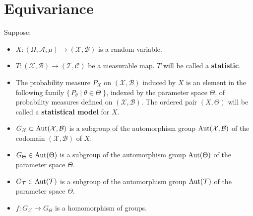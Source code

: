 
\newcommand{\Aut}{\textnormal{Aut}}

\section{Equivariance}
\setcounter{theorem}{0}

\begin{definition}\quad
Suppose:
\begin{itemize}
	\item $X : (\Omega,\mathcal{A},\mu) \longrightarrow (\mathcal{X},\mathcal{B})$ is a random
	      variable.
	\item $T : (\mathcal{X},\mathcal{B}) \longrightarrow (\mathcal{T},\mathcal{C})$ be a measurable
	      map.  $T$ will be called a \textbf{statistic}.
	\item The probability measure $P_{X}$ on $(\mathcal{X},\mathcal{B})$ induced by $X$ is an element
	      in the following family $\{\,P_{\theta}\;\vert\;\theta\in\Theta\;\}$, indexed by the
	      parameter space $\Theta$, of probability measures defined on $(\mathcal{X},\mathcal{B})$.
	      The ordered pair $(X,\Theta)$ will be called a \textbf{statistical model} for $X$.

	\item $G_{\mathcal{X}} \subset \Aut(\mathcal{X},\mathcal{B})$ is a subgroup of the automorphism
	      group $\Aut(\mathcal{X},\mathcal{B})$ of the codomain $(\mathcal{X},\mathcal{B})$ of $X$.

	\item $G_{\Theta} \in \Aut(\Theta)$ is a subgroup of the automorphism group $\Aut(\Theta)$ of
	the parameter space $\Theta$.

	\item $G_{\mathcal{T}} \in \Aut(\mathcal{T})$ is a subgroup of the automorphism group
	      $\Aut(\mathcal{T})$ of the parameter space $\Theta$.

	\item $f:G_{\mathcal{X}} \longrightarrow G_{\Theta}$ is a homomorphism of groups.


\end{itemize}
\end{definition}
